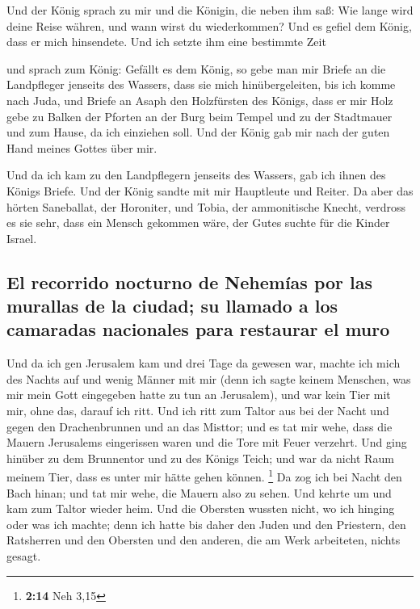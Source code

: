  Und der König sprach zu mir und die Königin, die neben
ihm saß: Wie lange wird deine Reise währen, und wann wirst du
wiederkommen? Und es gefiel dem König, dass er mich hinsendete. Und ich
setzte ihm eine bestimmte Zeit

 und sprach zum König: Gefällt es dem König, so gebe man
mir Briefe an die Landpfleger jenseits des Wassers, dass sie mich
hinübergeleiten, bis ich komme nach Juda,  und Briefe an
Asaph den Holzfürsten des Königs, dass er mir Holz gebe zu Balken der
Pforten an der Burg beim Tempel und zu der Stadtmauer und zum Hause, da
ich einziehen soll. Und der König gab mir nach der guten Hand meines
Gottes über mir.

 Und da ich kam zu den Landpflegern jenseits des Wassers,
gab ich ihnen des Königs Briefe. Und der König sandte mit mir Hauptleute
und Reiter.  Da aber das hörten Saneballat, der
Horoniter, und Tobia, der ammonitische Knecht, verdross es sie sehr,
dass ein Mensch gekommen wäre, der Gutes suchte für die Kinder Israel.

\hypertarget{el-recorrido-nocturno-de-nehemuxedas-por-las-murallas-de-la-ciudad-su-llamado-a-los-camaradas-nacionales-para-restaurar-el-muro}{%
\subsection{El recorrido nocturno de Nehemías por las murallas de la
ciudad; su llamado a los camaradas nacionales para restaurar el
muro}\label{el-recorrido-nocturno-de-nehemuxedas-por-las-murallas-de-la-ciudad-su-llamado-a-los-camaradas-nacionales-para-restaurar-el-muro}}

 Und da ich gen Jerusalem kam und drei Tage da gewesen
war,  machte ich mich des Nachts auf und wenig Männer mit
mir (denn ich sagte keinem Menschen, was mir mein Gott eingegeben hatte
zu tun an Jerusalem), und war kein Tier mit mir, ohne das, darauf ich
ritt.  Und ich ritt zum Taltor aus bei der Nacht und
gegen den Drachenbrunnen und an das Misttor; und es tat mir wehe, dass
die Mauern Jerusalems eingerissen waren und die Tore mit Feuer verzehrt.
 Und ging hinüber zu dem Brunnentor und zu des Königs
Teich; und war da nicht Raum meinem Tier, dass es unter mir hätte gehen
können. \footnote{\textbf{2:14} Neh 3,15}  Da zog ich bei
Nacht den Bach hinan; und tat mir wehe, die Mauern also zu sehen. Und
kehrte um und kam zum Taltor wieder heim.  Und die
Obersten wussten nicht, wo ich hinging oder was ich machte; denn ich
hatte bis daher den Juden und den Priestern, den Ratsherren und den
Obersten und den anderen, die am Werk arbeiteten, nichts gesagt.


